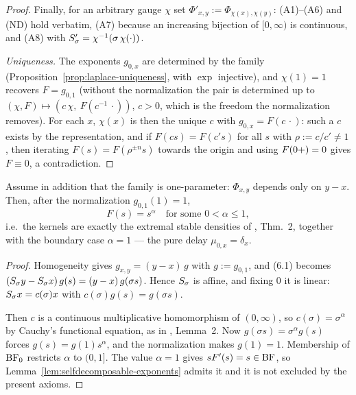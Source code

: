 \begin{proof}
Finally, for an arbitrary gauge $\chi$ set $\Phi'_{x,y} := \Phi_{\chi(x),\chi(y)}$: (A1)--(A6)
and (ND) hold verbatim, (A7) because an increasing bijection of $[0,\infty)$ is continuous, and
(A8) with $S'_\sigma = \chi^{-1}(\sigma\,\chi(\cdot))$.

\emph{Uniqueness.} The exponents $g_{0,x}$ are determined by the family
(Proposition~\ref{prop:laplace-uniqueness}, with $\exp$ injective), and $\chi(1) = 1$ recovers
$F = g_{0,1}$ (without the normalization the pair is determined up to
$(\chi, F) \mapsto (c\,\chi,\ F(c^{-1}\,\cdot))$, $c > 0$, which is the freedom the
normalization removes). For each $x$, $\chi(x)$ is then the unique $c$ with $g_{0,x} = F(c\,\cdot)$:
such a $c$ exists by the representation, and if $F(cs) = F(c's)$ for all $s$ with
$\rho := c/c' \ne 1$, then iterating $F(s) = F(\rho^{\pm n} s)$ towards the origin and using
$F(0{+}) = 0$ gives $F \equiv 0$, a contradiction.
\end{proof}

\begin{corollary}\label{cor:semigroup-case}
Assume in addition that the family is one-parameter: $\Phi_{x,y}$ depends only on $y - x$.
Then, after the normalization $g_{0,1}(1) = 1$,
\[
  F(s) = s^{\alpha} \quad \text{for some } 0 < \alpha \le 1,
\]
i.e.\ the kernels are exactly the extremal stable densities of
, Thm.~2, together with the boundary case $\alpha = 1$ --- the
pure delay $\mu_{0,x} = \delta_x$.
\end{corollary}

\begin{proof}
Homogeneity gives $g_{x,y} = (y - x)\,g$ with $g := g_{0,1}$, and (6.1) becomes
$(S_\sigma y - S_\sigma x)\, g(s) = (y - x)\, g(\sigma s)$. Hence $S_\sigma$ is
affine, and fixing $0$ it is linear: $S_\sigma x = c(\sigma) x$ with
$c(\sigma) g(s) = g(\sigma s)$.

Then $c$ is a continuous multiplicative homomorphism of $(0,\infty)$, so $c(\sigma) =
\sigma^\alpha$ by Cauchy's functional equation, as in ,
Lemma~2. Now $g(\sigma s) = \sigma^\alpha g(s)$ forces $g(s) = g(1) s^\alpha$, and the
normalization makes $g(1) = 1$. Membership of $\mathrm{BF}_0$ restricts $\alpha$ to $(0,1]$. The value
$\alpha = 1$ gives $sF'(s) = s \in \mathrm{BF}$, so Lemma~\ref{lem:selfdecomposable-exponents} admits
it and it is not excluded by the present axioms.
\end{proof}

